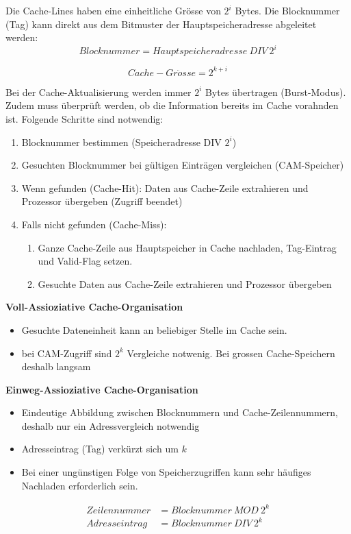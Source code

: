 Die Cache-Lines haben eine einheitliche Grösse von $2^i$ Bytes.
Die Blocknummer (Tag) kann direkt aus dem Bitmuster der Hauptspeicheradresse abgeleitet werden:
\begin{equation*}
	Blocknummer = Hauptspeicheradresse \ DIV \ 2^i
\end{equation*}

\begin{equation*}
	Cache-Gr\ddot{o}sse = 2^{k+i}
\end{equation*}

Bei der Cache-Aktualisierung werden immer $2^i$ Bytes übertragen (Burst-Modus).
Zudem muss überprüft werden, ob die Information bereits im Cache vorahnden ist.
Folgende Schritte sind notwendig:
\begin{enumerate}[noitemsep,topsep=0pt]
	\item Blocknummer bestimmen (Speicheradresse DIV $2^i$)
	\item Gesuchten Blocknummer bei gültigen Einträgen vergleichen (CAM-Speicher)
	\item Wenn gefunden (Cache-Hit): Daten aus Cache-Zeile extrahieren und Prozessor übergeben (Zugriff beendet)
	\item Falls nicht gefunden (Cache-Miss):
	\begin{enumerate}[noitemsep,topsep=0pt]
		\item Ganze Cache-Zeile aus Hauptspeicher in Cache nachladen, Tag-Eintrag und Valid-Flag setzen.
		\item Gesuchte Daten aus Cache-Zeile extrahieren und Prozessor übergeben
	\end{enumerate}
\end{enumerate}

	\textbf{Voll-Assioziative Cache-Organisation}
	\begin{itemize}[noitemsep,topsep=0pt]
		\item Gesuchte Dateneinheit kann an beliebiger Stelle im Cache sein.
		\item bei CAM-Zugriff sind $2 ^k$ Vergleiche notwenig. Bei grossen Cache-Speichern deshalb langsam
	\end{itemize}

	\textbf{Einweg-Assioziative Cache-Organisation}
	\begin{itemize}[noitemsep,topsep=0pt]
		\item Eindeutige Abbildung zwischen Blocknummern und Cache-Zeilennummern, deshalb nur ein Adressvergleich notwendig
		\item Adresseintrag (Tag) verkürzt sich um $k$
		\item Bei einer ungünstigen Folge von Speicherzugriffen kann sehr häufiges Nachladen erforderlich sein.
	\end{itemize}
	\begin{align*}
		Zeilennummer &= Blocknummer \ MOD \ 2^k\\
		Adresseintrag &= Blocknummer \ DIV \ 2^k
	\end{align*}

